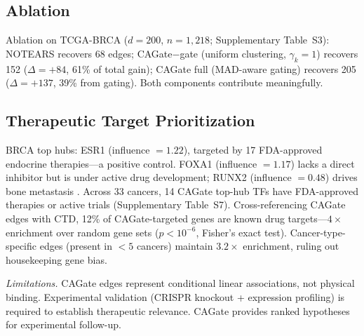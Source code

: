 \documentclass[12pt,a4paper]{article}
\begin{document}
\subsection{Ablation}









Ablation on TCGA-BRCA ($d=200$, $n=1,218$; Supplementary Table~S3): NOTEARS recovers 68 edges; CAGate$-$gate (uniform clustering, $\gamma_k=1$) recovers 152 ($\Delta=+84$, 61\% of total gain); CAGate full (MAD-aware gating) recovers 205 ($\Delta=+137$, 39\% from gating). Both components contribute meaningfully.









\subsection{Therapeutic Target Prioritization}









BRCA top hubs: ESR1 (influence $=1.22$), targeted by 17 FDA-approved endocrine therapies---a positive control. FOXA1 (influence $=1.17$) lacks a direct inhibitor but is under active drug development; RUNX2 (influence $=0.48$) drives bone metastasis \cite{Zhao2021}. Across 33 cancers, 14 CAGate top-hub TFs have FDA-approved therapies or active trials (Supplementary Table~S7). Cross-referencing CAGate edges with CTD, 12\% of CAGate-targeted genes are known drug targets---$4\times$ enrichment over random gene sets ($p < 10^{-6}$, Fisher's exact test). Cancer-type-specific edges (present in $<5$ cancers) maintain $3.2\times$ enrichment, ruling out housekeeping gene bias.









\textit{Limitations.} CAGate edges represent conditional linear associations, not physical binding. Experimental validation (CRISPR knockout + expression profiling) is required to establish therapeutic relevance. CAGate provides ranked hypotheses for experimental follow-up.
\end{document}
